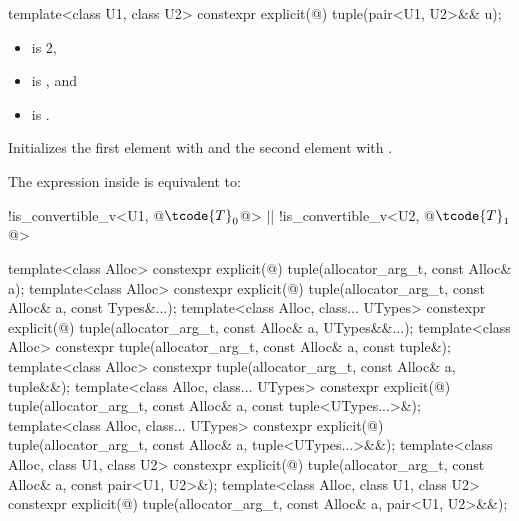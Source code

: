 %
%
\begin{itemdecl}
template<class U1, class U2> constexpr explicit(@\seebelow@) tuple(pair<U1, U2>&& u);
\end{itemdecl}

\begin{itemdescr}
\pnum
\constraints
\begin{itemize}
\item {} is 2,
\item {} is , and
\item {} is .
\end{itemize}

\pnum
\effects
Initializes the first element with
 and the
second element with .

\pnum
The expression inside  is equivalent to:
\begin{codeblock}
!is_convertible_v<U1, @$\tcode{T}_0$@> || !is_convertible_v<U2, @$\tcode{T}_1$@>
\end{codeblock}
\end{itemdescr}

%
\begin{itemdecl}
template<class Alloc>
  constexpr explicit(@\seebelow@)
    tuple(allocator_arg_t, const Alloc& a);
template<class Alloc>
  constexpr explicit(@\seebelow@)
    tuple(allocator_arg_t, const Alloc& a, const Types&...);
template<class Alloc, class... UTypes>
  constexpr explicit(@\seebelow@)
    tuple(allocator_arg_t, const Alloc& a, UTypes&&...);
template<class Alloc>
  constexpr tuple(allocator_arg_t, const Alloc& a, const tuple&);
template<class Alloc>
  constexpr tuple(allocator_arg_t, const Alloc& a, tuple&&);
template<class Alloc, class... UTypes>
  constexpr explicit(@\seebelow@)
    tuple(allocator_arg_t, const Alloc& a, const tuple<UTypes...>&);
template<class Alloc, class... UTypes>
  constexpr explicit(@\seebelow@)
    tuple(allocator_arg_t, const Alloc& a, tuple<UTypes...>&&);
template<class Alloc, class U1, class U2>
  constexpr explicit(@\seebelow@)
    tuple(allocator_arg_t, const Alloc& a, const pair<U1, U2>&);
template<class Alloc, class U1, class U2>
  constexpr explicit(@\seebelow@)
    tuple(allocator_arg_t, const Alloc& a, pair<U1, U2>&&);
\end{itemdecl}

